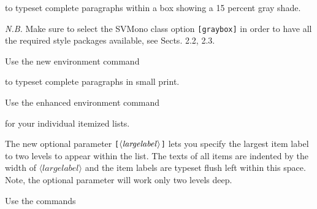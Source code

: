 \documentclass[graybox,square]{svmono}
\begin{document}
\begin{sloppy}
to typeset complete paragraphs within a box showing a 15 percent gray shade.

{\it N.B.} Make sure to select the {\sc SVMono} class option \verb|[graybox]| in order to have all the required style packages available, see Sects. 2.2, 2.3. 

Use the new environment command

\cprotect{}

to typeset complete paragraphs in small print.

Use the enhanced environment command

\cprotect{}

for your individual itemized lists.

The new optional parameter \verb|[|$\langle {\it largelabel}\rangle$\verb|]| lets you specify the largest item label to two levels to appear within the list. The texts of all items are indented by the width of $\langle largelabel\rangle$ and the item labels are typeset flush left within this space. Note, the optional parameter will work only two levels deep.

\eject

Use the commands

\cprotect{}


\end{sloppy}
\end{document}
